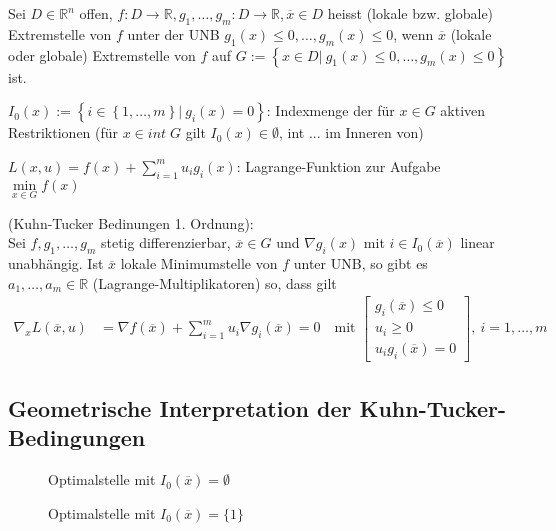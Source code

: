 \begin{defi}
Sei $D\in\mathbb{R}^n$ offen, $f:D\rightarrow\mathbb{R},g_1,\ldots,g_m:D\rightarrow\mathbb{R},\overline{x}\in D$ heisst (lokale bzw. globale) Extremstelle von $f$ unter der \ac{UNB}
$g_1(x)\le 0,\ldots,g_m(x)\le 0$, wenn $\overline{x}$ (lokale oder globale) Extremstelle von $f$ auf $G:=\left\{x\in D|\ g_1(x)\le 0,\ldots,g_m(x)\le 0\right\}$ ist.
\end{defi}
\begin{defi}
$I_0(x):=\left\{ i\in\left\{ 1,\ldots,m \right\}|\ g_i(x)=0 \right\}$: Indexmenge der für $x\in G$ aktiven Restriktionen (für $x\in int\; G$ gilt $I_0(x)\in\emptyset$, int ... im Inneren von)
\end{defi}
$L(x,u)=f(x)+\sum\limits_{i=1}^{m}u_ig_i(x)$: Lagrange-Funktion zur Aufgabe $\min\limits_{x\in G}f(x)$
\begin{satz}\label{satz:4}
	(Kuhn-Tucker Bedinungen 1. Ordnung):\\
	Sei $f,g_1,\ldots,g_m$ stetig differenzierbar, $\overline{x}\in G$ und $\nabla g_i(x)$ mit $i\in I_0(\overline{x})$ linear unabhängig. Ist $\overline{x}$ lokale Minimumstelle von $f$
	unter \ac{UNB}, so gibt es $a_1,\ldots,a_m\in\mathbb{R}$ (Lagrange-Multiplikatoren) so, dass gilt
	\begin{align*}
	\nabla_x L(\overline{x},u) & = \nabla f(\overline{x})+\sum\limits_{i=1}^m u_i\nabla g_i(\overline{x})= 0\quad\text{mit } \begin{bmatrix}
	g_i(\overline{x})\le 0\\ u_i\ge 0\\ u_ig_i(\overline{x})=0
	\end{bmatrix},\ i=1,\ldots,m
	\end{align*}
\end{satz}
\subsection{Geometrische Interpretation der Kuhn-Tucker-Bedingungen}
\begin{figure}[!htb]
	\centering
	
	\caption{Optimalstelle mit $I_0(\overline{x})=\emptyset$}
	\label{fig:kap_1_ktb_opt_0}
\end{figure}

\begin{figure}[!htb]
	\centering
	
	\caption{Optimalstelle mit $I_0(\overline{x})=\{1\}$}
	\label{fig:kap_1_ktb_opt_1}
\end{figure}

